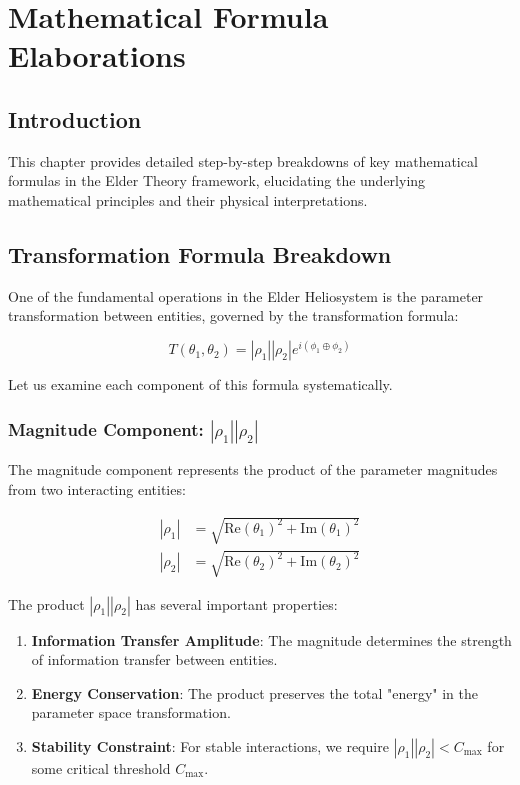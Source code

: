 \chapter{Mathematical Formula Elaborations}

\section{Introduction}

This chapter provides detailed step-by-step breakdowns of key mathematical formulas in the Elder Theory framework, elucidating the underlying mathematical principles and their physical interpretations.

\section{Transformation Formula Breakdown}

One of the fundamental operations in the Elder Heliosystem is the parameter transformation between entities, governed by the transformation formula:

\begin{equation}
T(\theta_1, \theta_2) = |\rho_1||\rho_2|e^{i(\phi_1 \oplus \phi_2)}
\end{equation}

Let us examine each component of this formula systematically.

\subsection{Magnitude Component: $|\rho_1||\rho_2|$}

The magnitude component represents the product of the parameter magnitudes from two interacting entities:

\begin{align}
|\rho_1| &= \sqrt{\text{Re}(\theta_1)^2 + \text{Im}(\theta_1)^2} \\
|\rho_2| &= \sqrt{\text{Re}(\theta_2)^2 + \text{Im}(\theta_2)^2}
\end{align}

The product $|\rho_1||\rho_2|$ has several important properties:

\begin{enumerate}
    \item \textbf{Information Transfer Amplitude}: The magnitude determines the strength of information transfer between entities.
    \item \textbf{Energy Conservation}: The product preserves the total "energy" in the parameter space transformation.
    \item \textbf{Stability Constraint}: For stable interactions, we require $|\rho_1||\rho_2| < C_{\text{max}}$ for some critical threshold $C_{\text{max}}$.
\end{enumerate}

